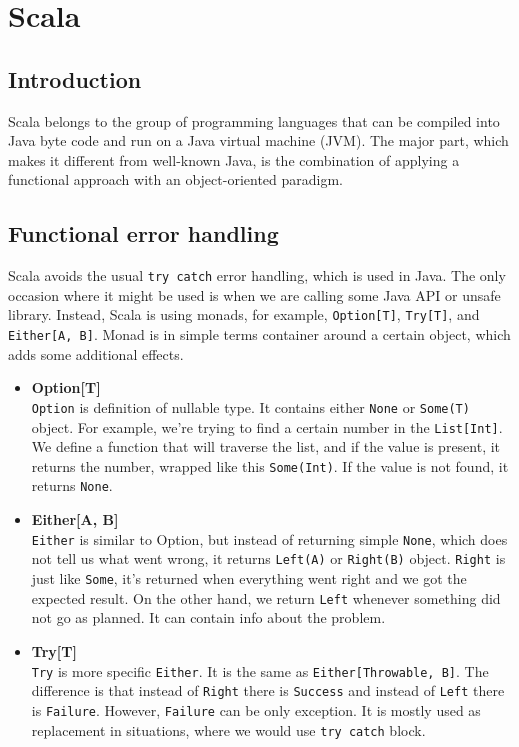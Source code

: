 \section{Scala}
\subsection{Introduction}
Scala belongs to the group of programming languages that can be compiled into Java byte code and run on a Java virtual machine (JVM). The major part, which makes it different from well-known Java, is the combination of applying a functional approach with an object-oriented paradigm. 

\subsection{Functional error handling}
Scala avoids the usual \texttt{try catch} error handling, which is used in Java. The only occasion where it might be used is when we are calling some Java API or unsafe library. Instead, Scala is using monads, for example, \texttt{Option[T]}, \texttt{Try[T]}, and \texttt{Either[A, B]}. Monad is in simple terms container around a certain object, which adds some additional effects. 
\begin{itemize}
    \item \textbf{Option[T]} \\
        \texttt{Option} is definition of nullable type. It contains either \texttt{None} or \texttt{Some(T)} object. For example, we're trying to find a certain number in the \texttt{List[Int]}. We define a function that will traverse the list, and if the value is present, it returns the number, wrapped like this \texttt{Some(Int)}. If the value is not found, it returns \texttt{None}.
    \item \textbf{Either[A, B]} \\
        \texttt{Either} is similar to Option, but instead of returning simple \texttt{None}, which does not tell us what went wrong, it returns \texttt{Left(A)} or \texttt{Right(B)} object. \texttt{Right} is just like \texttt{Some}, it's returned when everything went right and we got the expected result. On the other hand, we return \texttt{Left} whenever something did not go as planned. It can contain info about the problem.
    \item \textbf{Try[T]} \\
        \texttt{Try} is more specific \texttt{Either}. It is the same as \texttt{Either[Throwable, B]}. The difference is that instead of \texttt{Right} there is \texttt{Success} and instead of \texttt{Left} there is \texttt{Failure}. However, \texttt{Failure} can be only exception. It is mostly used as replacement in situations, where we would use \texttt{try catch} block.
\end{itemize}

